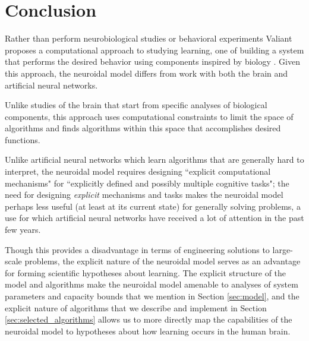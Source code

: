 \documentclass[letterpaper, 12pt]{article}
\begin{document}
\section{Conclusion}
Rather than perform neurobiological studies or behavioral experiments Valiant proposes a computational approach to studying learning, one of building a system that performs the desired behavior using components inspired by biology \cite{valiant_circuits_1994}. Given this approach, the neuroidal model differs from work with both the brain and artificial neural networks.

Unlike studies of the brain that start from specific analyses of biological components, this approach uses computational constraints to limit the space of algorithms and finds algorithms within this space that accomplishes desired functions.

Unlike artificial neural networks which learn algorithms that are generally hard to interpret, the neuroidal model requires designing ``explicit computational mechanisms" for ``explicitly defined and possibly multiple cognitive tasks"; the need for designing \textit{explicit} mechanisms and tasks makes the neuroidal model perhaps less useful (at least at its current state) for generally solving problems, a use for which artificial neural networks have received a lot of attention in the past few years.

Though this provides a disadvantage in terms of engineering solutions to large-scale problems, the explicit nature of the neuroidal model serves as an advantage for forming scientific hypotheses about learning. The explicit structure of the model and algorithms make the neuroidal model amenable to analyses of system parameters and capacity bounds that we mention in Section \ref{sec:model}, and the explicit nature of algorithms that we describe and implement in Section \ref{sec:selected_algorithms} allows us to more directly map the capabilities of the neuroidal model to hypotheses about how learning occurs in the human brain.



\end{document}
